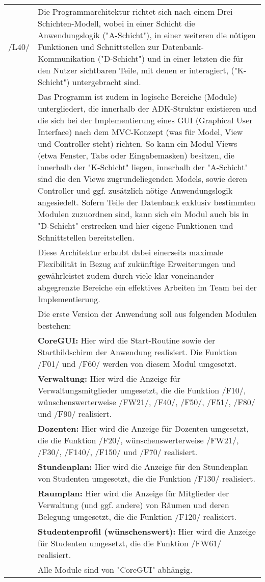 \begin{tabular}{p{1.5cm}p{14.5cm}}
						
	 /L40/	& Die Programmarchitektur richtet sich nach einem Drei-Schichten-Modell, wobei in einer Schicht die Anwendungslogik ("A-Schicht"), in einer weiteren die nötigen Funktionen und Schnittstellen zur Datenbank-Kommunikation ("D-Schicht") und in einer letzten die für den Nutzer sichtbaren Teile, mit denen er interagiert, ("K-Schicht") untergebracht sind.\\
	 & Das Programm ist zudem in logische Bereiche (Module) untergliedert, die innerhalb der ADK-Struktur existieren und die sich bei der Implementierung eines GUI (Graphical User Interface) nach dem MVC-Konzept (was für Model, View und Controller steht) richten. So kann ein Modul Views (etwa Fenster, Tabs oder Eingabemasken) besitzen, die innerhalb der "K-Schicht" liegen, innerhalb der "A-Schicht" sind die den Views zugrundeliegenden Models, sowie deren Controller und ggf. zusätzlich nötige Anwendungslogik angesiedelt. Sofern Teile der Datenbank exklusiv bestimmten Modulen zuzuordnen sind, kann sich ein Modul auch bis in "D-Schicht" erstrecken und hier eigene Funktionen und Schnittstellen bereitstellen. \\
	 & Diese Architektur erlaubt dabei einerseits maximale Flexibilität in Bezug auf zukünftige Erweiterungen und gewährleistet zudem durch viele klar voneinander abgegrenzte Bereiche ein effektives Arbeiten im Team bei der Implementierung. \\[0.15cm]
	 &	Die erste Version der Anwendung soll aus folgenden Modulen bestehen: \\[0.15cm]
	 &	\textbf{CoreGUI:} Hier wird die Start-Routine sowie der Startbildschirm der Anwendung realisiert. Die Funktion /F01/ und /F60/ werden von diesem Modul umgesetzt.\\[0.15cm]
	 &	\textbf{Verwaltung:} Hier wird die Anzeige für Verwaltungsmitglieder umgesetzt, die die Funktion /F10/, wünschenswerterweise /FW21/, /F40/, /F50/, /F51/, /F80/ und /F90/ realisiert.\\[0.15cm]
	 &	\textbf{Dozenten:} Hier wird die Anzeige für Dozenten umgesetzt, die die Funktion /F20/, wünschenswerterweise /FW21/, /F30/, /F140/, /F150/ und /F70/ realisiert.\\[0.15cm]
	 &	\textbf{Stundenplan:} Hier wird die Anzeige für den Stundenplan von Studenten umgesetzt, die die Funktion /F130/ realisiert.\\
	 &	\textbf{Raumplan:} Hier wird die Anzeige für Mitglieder der Verwaltung (und ggf. andere) von Räumen und deren Belegung umgesetzt, die die Funktion /F120/ realisiert.\\[0.15cm]
	 &	\textbf{Studentenprofil (wünschenswert):} Hier wird die Anzeige für Studenten umgesetzt, die die Funktion /FW61/ realisiert.\\[0.15cm]
	 & Alle Module sind von "CoreGUI" abhängig.\\[0.25cm]

\end{tabular}


